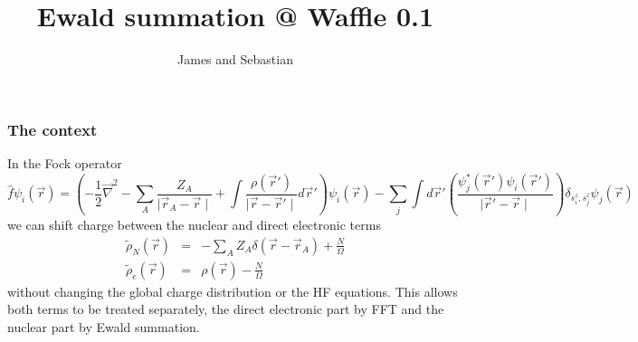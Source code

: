 \documentclass[8pt]{beamer}
\author[James and Sebastian]{James and Sebastian}
\title[Ewald summation]{Ewald summation @ Waffle 0.1}
\date[]{}
\begin{document}
\begin{frame}
 \titlepage
\end{frame}

\begin{frame}

   \frametitle{The context}
   In the Fock operator
   \begin{equation}
\hat{f} \psi_i(\vec{r}) = \left( - \frac{1}{2} \vec{\nabla}^2 - \sum\limits_{A} \frac{Z_A}{\mid \vec{r}_A - \vec{r} \mid} + \int \frac{\rho(\vec{r}')}{\mid \vec{r} - \vec{r}' \mid} d\vec{r}' \right) \psi_i(\vec{r}) - \sum\limits_j \int d\vec{r}' \left( \frac{\psi_j^*(\vec{r}') \psi_i(\vec{r}')}{\mid \vec{r}' - \vec{r} \mid} \right) \delta_{s^z_i,s^z_j} \psi_j(\vec{r}) \nonumber
\end{equation}
   we can shift charge between the nuclear and direct electronic terms
   \begin{eqnarray}
\tilde{\rho}_N(\vec{r}) & = & - \sum\limits_A Z_A \delta(\vec{r} - \vec{r}_A) + \frac{N}{\Omega} \\
\tilde{\rho}_e(\vec{r}) & = & \rho(\vec{r}) - \frac{N}{\Omega} \label{hhh}
\end{eqnarray}
   without changing the global charge distribution or the HF equations. This allows both terms to be treated separately, the direct electronic part by FFT and the nuclear part by Ewald summation.

\end{frame}
\end{document}
